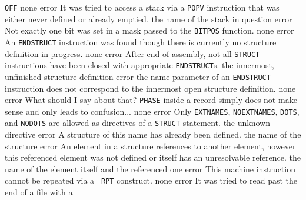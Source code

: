 \documentclass[12pt,twoside]{report}
\newcommand{\tty}[1]{{\tt #1}}
\begin{document}
\begin{description}
{                \tty{OFF}}
               {none}
               {error}
               {It was tried to access a stack via a \tty{POPV} instruction
                that was either never defined or already emptied.}
               {the name of the stack in question}
               {error}
               {Not exactly one bit was set in a mask passed to the
                \tty{BITPOS} function.}
               {none}
               {error}
               {An \tty{ENDSTRUCT} instruction was found though there is
                currently no structure definition in progress.}
               {none}
               {error}
               {After end of assembly, not all \tty{STRUCT} instructions
                have been closed with appropriate \tty{ENDSTRUCT}s.}
               {the innermost, unfinished structure definition}
               {error}
               {the name parameter of an \tty{ENDSTRUCT} instruction does
                not correspond to the innermost open structure
                definition.}
               {none}
               {error}
               {What should I say about that?  \tty{PHASE} inside a record
                simply does not make sense and only leads to
                confusion...}
               {none}
\errentry{1554}{invalid \tty{STRUCT} directive}
               {error}
               {Only \tty{EXTNAMES}, \tty{NOEXTNAMES}, \tty{DOTS},
                and \tty{NODOTS} are allowed as directives of a
                \tty{STRUCT} statement.}
               {the unknown directive}
               {error}
               {A structure of this name has already been defined.}
               {the name of the structure}
               {error}
               {An element in a structure references to another
                element, however this referenced element was not
                defined or itself has an unresolvable reference.}
               {the name of the element itself and the referenced one}
               {error}
               {This machine instruction cannot be repeated via a {\tt
                RPT} construct.}
               {none}
               {error}
               {It was tried to read past the end of a file with a
}
\end{description}
\end{document}
